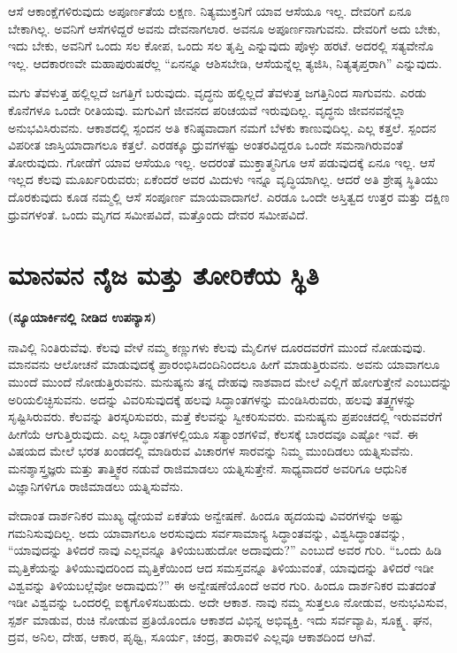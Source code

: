 \vskip 0.2cm

ಆಸೆ ಆಕಾಂಕ್ಷೆಗಳಿರುವುದು ಅಪೂರ್ಣತೆಯ ಲಕ್ಷಣ. ನಿತ್ಯಮುಕ್ತನಿಗೆ ಯಾವ ಆಸೆಯೂ ಇಲ್ಲ. ದೇವರಿಗೆ ಏನೂ ಬೇಕಾಗಿಲ್ಲ. ಅವನಿಗೆ ಆಸೆಗಳಿದ್ದರೆ ಅವನು ದೇವನಾಗಲಾರ. ಅವನೂ ಅಪೂರ್ಣನಾಗುವನು. ದೇವರಿಗೆ ಅದು ಬೇಕು, ಇದು ಬೇಕು, ಅವನಿಗೆ ಒಂದು ಸಲ ಕೋಪ, ಒಂದು ಸಲ ತೃಪ್ತಿ ಎನ್ನುವುದು ಪೊಳ್ಳು ಹರಟೆ. ಅದರಲ್ಲಿ ಸತ್ಯವೇನೊ ಇಲ್ಲ. ಆದಕಾರಣವೇ ಮಹಾಪುರುಷರೆಲ್ಲ “ಏನನ್ನೂ ಆಶಿಸಬೇಡಿ, ಆಸೆಯನ್ನೆಲ್ಲ ತ್ಯಜಿಸಿ, ನಿತ್ಯತೃಪ್ತರಾಗಿ” ಎನ್ನುವುದು.

\vskip 0.2cm

ಮಗು ತೆವಳುತ್ತ ಹಲ್ಲಿಲ್ಲದೆ ಜಗತ್ತಿಗೆ ಬರುವುದು. ವೃದ್ಧನು ಹಲ್ಲಿಲ್ಲದೆ ತೆವಳುತ್ತ ಜಗತ್ತಿನಿಂದ ಸಾಗುವನು. ಎರಡು ಕೊನೆಗಳೂ ಒಂದೇ ರೀತಿಯವು. ಮಗುವಿಗೆ ಜೀವನದ ಪರಿಚಯವೆ ಇರುವುದಿಲ್ಲ. ವೃದ್ಧನು ಜೀವನವನ್ನೆಲ್ಲಾ ಅನುಭವಿಸಿರುವನು. ಆಕಾಶದಲ್ಲಿ ಸ್ಪಂದನ ಅತಿ ಕನಿಷ್ಠವಾದಾಗ ನಮಗೆ ಬೆಳಕು ಕಾಣುವುದಿಲ್ಲ. ಎಲ್ಲ ಕತ್ತಲೆ. ಸ್ಪಂದನ ವಿಪರೀತ ಜಾಸ್ತಿಯಾದಾಗಲೂ ಕತ್ತಲೆ. ಎರಡಕ್ಕೂ ಧ್ರುವಗಳಷ್ಟು ಅಂತರವಿದ್ದರೂ ಒಂದೇ ಸಮನಾಗಿರುವಂತೆ ತೋರುವುದು. ಗೋಡೆಗೆ ಯಾವ ಆಸೆಯೂ ಇಲ್ಲ. ಅದರಂತೆ ಮುಕ್ತಾತ್ಮನಿಗೂ ಆಸೆ ಪಡುವುದಕ್ಕೆ ಏನೂ ಇಲ್ಲ. ಆಸೆ ಇಲ್ಲದ ಕೆಲವು ಮೂರ್ಖರಿರುವರು; ಏಕೆಂದರೆ ಅವರ ಮಿದುಳು ಇನ್ನೂ ವೃದ್ಧಿಯಾಗಿಲ್ಲ. ಆದರೆ ಅತಿ ಶ್ರೇಷ್ಠ ಸ್ಥಿತಿಯು ದೊರಕುವುದು ಕೂಡ ನಮ್ಮಲ್ಲಿ ಆಸೆ ಸಂಪೂರ್ಣ ಮಾಯವಾದಾಗಲೆ. ಎರಡೂ ಒಂದೇ ಅಸ್ತಿತ್ವದ ಉತ್ತರ ಮತ್ತು ದಕ್ಷಿಣ ಧ್ರುವಗಳಂತೆ. ಒಂದು ಮೃಗದ ಸಮೀಪವಿದೆ, ಮತ್ತೊಂದು ದೇವರ ಸಮೀಪವಿದೆ.

\chapter{ಮಾನವನ ನೈಜ ಮತ್ತು ತೋರಿಕೆಯ ಸ್ಥಿತಿ}%

\centerline{\textbf{(ನ್ಯೂಯಾರ್ಕಿನಲ್ಲಿ ನೀಡಿದ ಉಪನ್ಯಾಸ)}}

ನಾವಿಲ್ಲಿ ನಿಂತಿರುವೆವು. ಕೆಲವು ವೇಳೆ ನಮ್ಮ ಕಣ್ಣುಗಳು ಕೆಲವು ಮೈಲಿಗಳ ದೂರದವರೆಗೆ ಮುಂದೆ ನೋಡುವುವು. ಮಾನವನು ಆಲೋಚನೆ ಮಾಡುವುದಕ್ಕೆ ಪ್ರಾರಂಭಿಸಿದಂದಿನಿಂದಲೂ ಹೀಗೆ ಮಾಡುತ್ತಿರುವನು. ಅವನು ಯಾವಾಗಲೂ ಮುಂದೆ ಮುಂದೆ ನೋಡುತ್ತಿರುವನು. ಮನುಷ್ಯನು ತನ್ನ ದೇಹವು ನಾಶವಾದ ಮೇಲೆ ಎಲ್ಲಿಗೆ ಹೋಗುತ್ತೇನೆ ಎಂಬುದನ್ನು ಅರಿಯಲಿಚ್ಛಿಸುವನು. ಅದನ್ನು ವಿವರಿಸುವುದಕ್ಕೆ ಹಲವು ಸಿದ್ಧಾಂತಗಳನ್ನು ಮಂಡಿಸಿರುವರು, ಹಲವು ತತ್ತ್ವಗಳನ್ನು ಸೃಷ್ಟಿಸಿರುವರು. ಕೆಲವನ್ನು ತಿರಸ್ಕರಿಸುವರು, ಮತ್ತೆ ಕೆಲವನ್ನು ಸ್ವೀಕರಿಸುವರು. ಮನುಷ್ಯನು ಪ್ರಪಂಚದಲ್ಲಿ ಇರುವವರೆಗೆ ಹೀಗೆಯೆ ಆಗುತ್ತಿರುವುದು. ಎಲ್ಲ ಸಿದ್ಧಾಂತಗಳಲ್ಲಿಯೂ ಸತ್ಯಾಂಶಗಳಿವೆ, ಕೆಲಸಕ್ಕೆ ಬಾರದವೂ ಎಷ್ಟೋ ಇವೆ. ಈ ವಿಷಯದ ಮೇಲೆ ಭರತ ಖಂಡದಲ್ಲಿ ಮಾಡಿರುವ ವಿಚಾರಗಳ ಸಾರವನ್ನು ನಿಮ್ಮ ಮುಂದಿಡಲು ಯತ್ನಿಸುವೆನು. ಮನಶ್ಶಾಸ್ತ್ರಜ್ಞರು ಮತ್ತು ತಾತ್ತ್ವಿಕರ ನಡುವೆ ರಾಜಿಮಾಡಲು ಯತ್ನಿಸುತ್ತೇನೆ. ಸಾಧ್ಯವಾದರೆ ಅವರಿಗೂ ಆಧುನಿಕ ವಿಜ್ಞಾನಿಗಳಿಗೂ ರಾಜಿಮಾಡಲು ಯತ್ನಿಸುವೆನು.

\vskip 0.2cm

ವೇದಾಂತ ದಾರ್ಶನಿಕರ ಮುಖ್ಯ ಧ್ಯೇಯವೆ ಏಕತೆಯ ಅನ್ವೇಷಣೆ. ಹಿಂದೂ ಹೃದಯವು ವಿವರಗಳನ್ನು ಅಷ್ಟು ಗಮನಿಸುವುದಿಲ್ಲ. ಅದು ಯಾವಾಗಲೂ ಅರಸುವುದು ಸರ್ವಸಾಮಾನ್ಯ ಸಿದ್ಧಾಂತವನ್ನು, ವಿಶ್ವಸಿದ್ಧಾಂತವನ್ನು, “ಯಾವುದನ್ನು ತಿಳಿದರೆ ನಾವು ಎಲ್ಲವನ್ನೂ ತಿಳಿಯಬಹುದೋ ಅದಾವುದು?” ಎಂಬುದೆ ಅವರ ಗುರಿ. “ಒಂದು ಹಿಡಿ ಮೃತ್ತಿಕೆಯನ್ನು ತಿಳಿಯುವುದರಿಂದ ಮೃತ್ತಿಕೆಯಿಂದ ಆದ ಸಮಸ್ತವನ್ನೂ ತಿಳಿಯುವಂತೆ, ಯಾವುದನ್ನು ತಿಳಿದರೆ ಇಡೀ ವಿಶ್ವವನ್ನು ತಿಳಿಯಬಲ್ಲೆವೋ ಅದಾವುದು?” ಈ ಅನ್ವೇಷಣೆಯೊಂದೆ ಅವರ ಗುರಿ. ಹಿಂದೂ ದಾರ್ಶನಿಕರ ಮತದಂತೆ ಇಡೀ ವಿಶ್ವವನ್ನು ಒಂದರಲ್ಲಿ ಐಕ್ಯಗೊಳಿಸಬಹುದು. ಅದೇ ಆಕಾಶ. ನಾವು ನಮ್ಮ ಸುತ್ತಲೂ ನೋಡುವ, ಅನುಭವಿಸುವ, ಸ್ಪರ್ಶ ಮಾಡುವ, ರುಚಿ ನೋಡುವ ಪ್ರತಿಯೊಂದೂ ಆಕಾಶದ ವಿಭಿನ್ನ ಅಭಿವ್ಯಕ್ತಿ. ಇದು ಸರ್ವವ್ಯಾಪಿ, ಸೂಕ್ಷ್ಮ. ಘನ, ದ್ರವ, ಅನಿಲ, ದೇಹ, ಆಕಾರ, ಪೃಥ್ವಿ, ಸೂರ್ಯ, ಚಂದ್ರ, ತಾರಾವಳಿ ಎಲ್ಲವೂ ಆಕಾಶದಿಂದ ಆಗಿವೆ.

